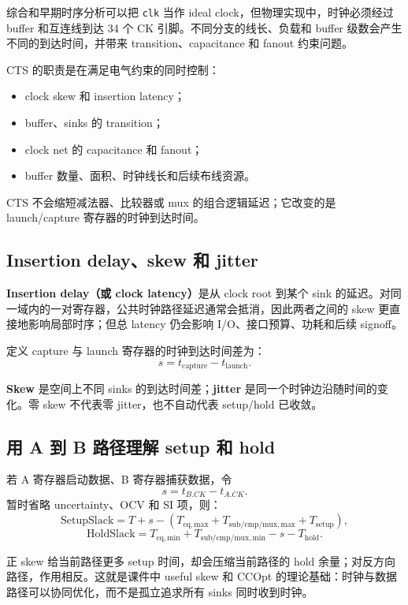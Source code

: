 \documentclass[UTF8,a4paper,11pt,fontset=fandol]{ctexart}
\newcommand{\code}[1]{\nolinkurl{#1}}
\begin{document}
综合和早期时序分析可以把 \code{clk} 当作 ideal clock，但物理实现中，时钟必须经过 buffer 和互连线到达 34 个 CK 引脚。不同分支的线长、负载和 buffer 级数会产生不同的到达时间，并带来 transition、capacitance 和 fanout 约束问题。

CTS 的职责是在满足电气约束的同时控制：
\begin{itemize}
  \item clock skew 和 insertion latency；
  \item buffer、sinks 的 transition；
  \item clock net 的 capacitance 和 fanout；
  \item buffer 数量、面积、时钟线长和后续布线资源。
\end{itemize}

CTS 不会缩短减法器、比较器或 mux 的组合逻辑延迟；它改变的是 launch/capture 寄存器的时钟到达时间。

\subsection{Insertion delay、skew 和 jitter}

\textbf{Insertion delay（或 clock latency）}是从 clock root 到某个 sink 的延迟。对同一域内的一对寄存器，公共时钟路径延迟通常会抵消，因此两者之间的 skew 更直接地影响局部时序；但总 latency 仍会影响 I/O、接口预算、功耗和后续 signoff。

定义 capture 与 launch 寄存器的时钟到达时间差为：
\[
  s=t_{\mathrm{capture}}-t_{\mathrm{launch}}.
\]

\textbf{Skew} 是空间上不同 sinks 的到达时间差；\textbf{jitter} 是同一个时钟边沿随时间的变化。零 skew 不代表零 jitter，也不自动代表 setup/hold 已收敛。

\subsection{用 A 到 B 路径理解 setup 和 hold}

若 A 寄存器启动数据、B 寄存器捕获数据，令
\[
  s=t_{B.CK}-t_{A.CK}.
\]
暂时省略 uncertainty、OCV 和 SI 项，则：
\[
  \mathrm{SetupSlack}
  =T+s-\left(T_{\mathrm{cq,max}}+
  T_{\mathrm{sub/cmp/mux,max}}+T_{\mathrm{setup}}\right),
\]
\[
  \mathrm{HoldSlack}
  =T_{\mathrm{cq,min}}+T_{\mathrm{sub/cmp/mux,min}}
  -s-T_{\mathrm{hold}}.
\]

正 skew 给当前路径更多 setup 时间，却会压缩当前路径的 hold 余量；对反方向路径，作用相反。这就是课件中 useful skew 和 CCOpt 的理论基础：时钟与数据路径可以协同优化，而不是孤立追求所有 sinks 同时收到时钟。
\end{document}
